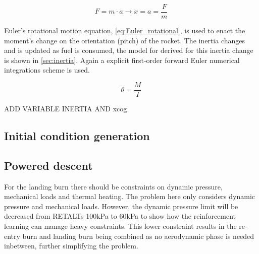 \begin{equation}
    F= m \cdot a \rightarrow \ddot{x} = a = \frac{F}{m}
\label{eq:Netwons2nd}
\end{equation}

Euler's rotational motion equation, \autoref{eq:Euler_rotational}, is used to enact the moment's change on the orientation (pitch) of the rocket. The inertia changes and is updated as fuel is consumed, the model for derived for this inertia change is shown in \autoref{sec:inertia}. Again a explicit first-order forward Euler numerical integrations scheme is used.

\begin{equation}
    \ddot{\theta} = \frac{M}{I}
\label{eq:Euler_rotational}
\end{equation}

ADD VARIABLE INERTIA AND xcog


\subsection{Initial condition generation}

\subsection{Powered descent}
For the landing burn there should be constraints on dynamic pressure, mechanical loads and thermal heating. The problem here only considers dynamic pressure and mechanical loads. However, the dynamic pressure limit will be decreased from RETALTs 100kPa to 60kPa to show how the reinforcement learning can manage heavy constraints. This lower constraint results in the re-entry burn and landing burn being combined as no aerodynamic phase is needed inbetween, further simplifying the problem.
